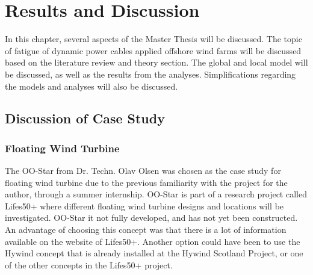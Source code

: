 \chapter{Results and Discussion}
\label{chap:discussion}
 In this chapter, several aspects of the Master Thesis will be discussed. The topic of fatigue of dynamic power cables applied offshore wind farms will be discussed based on the literature review and theory section. The global and local model will be discussed, as well as the results from the analyses. Simplifications regarding the models and analyses will also be discussed. 
 \section{Discussion of Case Study}
 \subsection{Floating Wind Turbine}
The OO-Star from Dr. Techn. Olav Olsen was chosen as the case study for floating wind turbine due to the previous familiarity with the project for the author, through a summer internship. OO-Star is part of a research project called Lifes50+ where different floating wind turbine designs and locations will be investigated. OO-Star it not fully developed, and has not yet been constructed. An advantage of choosing this concept was that there is a lot of information available on the website of Lifes50+. Another option could have been to use the Hywind concept that is already installed at the Hywind Scotland Project, or one of the other concepts in the Lifes50+ project.
